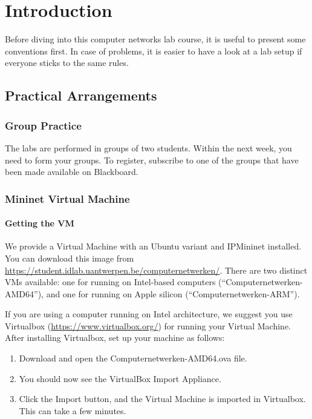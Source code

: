 
\chapter*{Introduction}

Before diving into this computer networks lab course, it is useful to present some conventions first.  In case of problems, it is easier to have a look at a lab setup if everyone sticks to the same rules.

\section{Practical Arrangements}
\subsection*{Group Practice}

The labs are performed in groups of two students. Within the next week, you need to form your groups. To register, subscribe to one of the groups that have been made available on Blackboard.

\subsection*{Mininet Virtual Machine}

\subsubsection{Getting the VM}
We provide a Virtual Machine with an Ubuntu variant and IPMininet installed. You can download this image from \url{https://student.idlab.uantwerpen.be/computernetwerken/}. There are two distinct VMs available: one for running on Intel-based computers (``Computernetwerken-AMD64''), and one for running on Apple silicon (``Computernetwerken-ARM'').

If you are using a computer running on Intel architecture, we suggest you use Virtualbox (\url{https://www.virtualbox.org/}) for running your Virtual Machine. After installing Virtualbox, set up your machine as follows:
\begin{enumerate}
\item Download and open the Computernetwerken-AMD64.ova file.
\item You should now see the VirtualBox Import Appliance.
\item Click the Import button, and the Virtual Machine is imported in Virtualbox. This can take a few minutes.
\end{enumerate}

